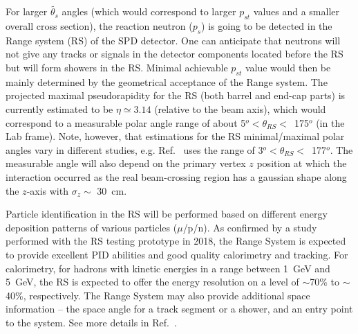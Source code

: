 



For larger $\widetilde{\theta_{s}}$ angles (which would correspond to larger $p_{st}$ values and a smaller overall cross section), the reaction neutron ($p_{s}$) is going to be detected in the Range system (RS) of the SPD detector. One can anticipate that neutrons will not give any tracks or signals in the detector components located before the RS but will form showers in the RS. Minimal achievable $p_{st}$ value would then be mainly determined by the geometrical acceptance of the Range system. The projected maximal pseudorapidity for the RS (both barrel and end-cap parts) is currently estimated to be $\eta\simeq 3.14$ (relative to the beam axis), which would correspond to a measurable polar angle range of about 5$^o<\theta_{RS}<$~175$^o$ (in the Lab frame). Note, however, that estimations for the RS minimal/maximal polar angles vary in different studies, e.g. Ref.~\cite{Skachkova:2020zdu} uses the range of 3$^o<\theta_{RS}<$~177$^o$. The measurable angle will also depend on the primary vertex $z$ position at which the interaction occurred as the real beam-crossing region has a gaussian shape along the $z$-axis with $\sigma_{z}\sim$ 30~cm\cite{TDR_SPD,Igamkulov:2019gdu}.


Particle identification in the RS will be performed based on different energy deposition patterns of various particles ($\mu$/p/n). As confirmed by a study performed with the RS testing prototype in 2018, the Range System is expected to provide excellent PID abilities and good quality calorimetry and tracking. For calorimetry, for hadrons with kinetic energies in a range between 1~GeV and 5~GeV, the RS is expected to offer the energy resolution on a level of $\sim$70\% to $\sim$40\%, respectively. The Range System may also provide additional space information – the space angle for a track segment or a shower, and an entry point to the system. See more details in Ref.~\cite{TDR_SPD}.



